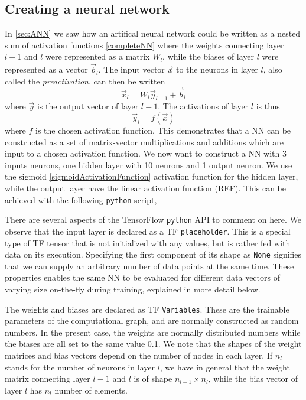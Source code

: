 \documentclass[twoside,english]{uiofysmaster}
\begin{document}
\subsection{Creating a neural network}
In \autoref{sec:ANN} we saw how an artifical neural network could be written as a nested sum 
of activation functions \eqref{completeNN} where the weights connecting layer $l-1$ and $l$ were represented as
a matrix $W_l$, while the biases of layer $l$ were represented as a vector $\vec{b}_l$. The input vector $\vec{x}$ to 
the neurons in layer $l$, also called the \textit{preactivation}, can then be written
\begin{equation}
 \vec{x}_l = W_l \vec{y}_{l-1}  + \vec{b}_l
 \label{preActivationLayer}
\end{equation}
where $\vec{y}$ is the output vector of layer $l-1$. The activations of layer $l$ is thus
\begin{equation}
 \vec{y}_l = f(\vec{x})
 \label{activationLayer}
\end{equation}
where $f$ is the chosen activation function. This demonstrates that a NN can be constructed 
as a set of matrix-vector multiplications and additions which are input to a chosen activation function. 
We now want to construct a NN with 3 inputs neurons, one hidden layer with 10 neurons and 1 output neuron. 
We use the sigmoid \eqref{sigmoidActivationFunction} activation function for the hidden layer, while 
the output layer have the linear activation function (REF).
This can be achieved with the following \texttt{python} script,

There are several aspects of the TensorFlow \texttt{python} API to comment on here. 
We observe that the input layer is declared as a TF \texttt{placeholder}. This is a special
type of TF tensor that is not initialized with any values, but is rather fed with data on its execution.
Specifying the first component of its shape as \texttt{None} signifies that we can supply an arbitrary 
number of data points at the same time.
These properties enables the same NN to be evaluated for different data vectors of varying size on-the-fly during training, 
explained in more detail below. 

The weights and biases are declared as TF \texttt{Variables}. These are the trainable parameters 
of the computational graph, and are normally constructed as random numbers. In the present case,
the weights are normally distributed numbers while the biases are all set to the same value 0.1. 
We note that the shapes of the weight matrices and bias vectors depend on the number of nodes in each layer.
If $n_l$ stands for the number of neurons in layer $l$, we have in general that the weight matrix connecting
layer $l-1$ and $l$ is of shape $n_{l-1} \times n_l$, while the bias vector of layer $l$ has $n_l$ number of elements. 
\end{document}
